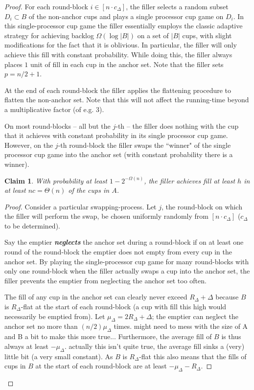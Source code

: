 \documentclass[twocolumn]{article}[10pt]
\newcommand{\defn}[1]{{\textit{\textbf{\boldmath #1}}}\xspace}
\newtheorem{clm}{Claim}
\begin{document}
\begin{proof}
For each round-block $i\in [n\cdot c_\Delta]$, the filler selects a random subset
$D_i\subset B$ of the non-anchor cups and plays a single processor cup game on
$D_i$. In this single-processor cup game the filler essentially employs the
classic adaptive strategy for achieving backlog $\Omega(\log |B|)$ on a set of
$|B|$ cups, with slight modifications for the fact that it is oblivious. In
particular, the filler will only achieve this fill with constant probability.
While doing this, the filler always places $1$ unit of fill in each cup in the
anchor set. Note that the filler sets $p=n/2+1$.

At the end of each round-block the filler applies the flattening procedure to
flatten the non-anchor set. Note that this will not affect the running-time beyond a
multiplicative factor (of e.g. $3$). 

On most round-blocks -- all but the $j$-th -- the filler does nothing with the
cup that it achieves with constant probability in its single processor cup
game. However, on the $j$-th round-block the filler swaps the ``winner" of the
single processor cup game into the anchor set (with constant probability there
is a winner).

\begin{clm} \label{clm:reg} 
  With probability at least $1-2^{-\Omega(n)}$, the filler achieves fill
  at least $h$ in at least $nc = \Theta(n)$ of the cups in $A$. 
\end{clm}
\begin{proof}
  Consider a particular swapping-process. Let $j$, the round-block on which the
  filler will perform the swap, be chosen uniformly randomly from $[n\cdot
  c_\Delta]$ ($c_\Delta$ to be determined).
 
  Say the emptier \defn{neglects} the anchor set during a round-block if on at
  least one round of the round-block the emptier does not empty from every cup
  in the anchor set. By playing the single-processor cup game for many
  round-blocks with only one round-block when the filler actually swaps a cup
  into the anchor set, the filler prevents the emptier from neglecting the
  anchor set too often.

  The fill of any cup in the anchor set can clearly never exceed
  $R_\Delta+\Delta$ because $B$ is $R_\Delta$-flat at the start of each
  round-block (a cup with fill this high would necessarily be emptied from).
  Let $\mu_\Delta = 2R_\Delta+\Delta$; the emptier can neglect the anchor set
  no more than $(n/2)\mu_\Delta$ times. 
  {\color{red} might need to mess with the size of A and B a bit to make this more true... }
  Furthermore, the average fill of $B$ is thus always at least $-\mu_\Delta$.
  {\color{red} actually this isn't quite true, the average fill sinks a (very)
  little bit (a very small constant)}.
  As $B$ is $R_\Delta$-flat this also means that the fills of cups in $B$ at
  the start of each round-block are at least $-\mu_\Delta-R_\Delta$.


\end{proof}
\end{proof}
\end{document}
